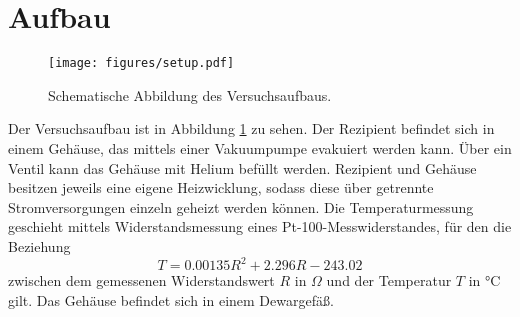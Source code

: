 \cite{FP}

\section{Aufbau}
\begin{figure}
\centering 
\texttt{[image: figures/setup.pdf]}
\caption{Schematische Abbildung des Versuchsaufbaus. \cite{FP}}
\label{fig:aufbau:setup}
\end{figure}
Der Versuchsaufbau ist in Abbildung \ref{fig:aufbau:setup} zu sehen. Der 
Rezipient befindet sich in einem Gehäuse, das mittels einer Vakuumpumpe 
evakuiert werden kann. Über ein Ventil kann das Gehäuse mit Helium befüllt 
werden. Rezipient und Gehäuse besitzen jeweils eine eigene Heizwicklung, sodass 
diese über getrennte Stromversorgungen einzeln geheizt werden können. Die 
Temperaturmessung geschieht mittels Widerstandsmessung eines Pt-100-Messwiderstandes, 
für den die Beziehung 
\begin{equation}
T = 0.00135 R^2 + 2.296 R -243.02
\end{equation}
zwischen dem gemessenen Widerstandswert $R$ in $\Omega$ und der Temperatur $T$ in 
$\si{\celsius}$ gilt. Das Gehäuse befindet sich in einem Dewargefäß.